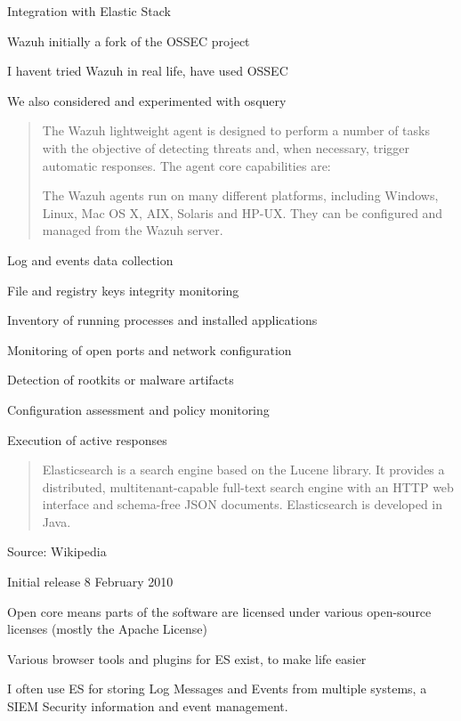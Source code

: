 \documentclass[Screen16to9,17pt]{foils}
\begin{document}
\begin{list2}
\item Integration with Elastic Stack
\item Wazuh initially a fork of the OSSEC project
\item I havent tried Wazuh in real life, have used OSSEC
\item We also considered and experimented with osquery 
\end{list2}



\begin{quote}
The Wazuh lightweight agent is designed to perform a number of tasks with the objective of detecting threats and, when necessary, trigger automatic responses. The agent core capabilities are:

The Wazuh agents run on many different platforms, including Windows, Linux, Mac OS X, AIX, Solaris and HP-UX. They can be configured and managed from the Wazuh server.
\end{quote}

\begin{list2}
\item Log and events data collection
\item File and registry keys integrity monitoring
\item Inventory of running processes and installed applications
\item Monitoring of open ports and network configuration
\item Detection of rootkits or malware artifacts
\item Configuration assessment and policy monitoring
\item Execution of active responses
\end{list2}



\begin{quote}
Elasticsearch is a search engine based on the Lucene library. It provides a distributed, multitenant-capable full-text search engine with an HTTP web interface and schema-free JSON documents. Elasticsearch is developed in Java.
\end{quote}

Source: Wikipedia 

\begin{list2}
\item Initial release	8 February 2010
\item Open core means parts of the software are licensed under various open-source licenses (mostly the Apache License)
\item Various browser tools and plugins for ES exist, to make life easier
\item I often use ES for storing Log Messages and Events from multiple systems, a SIEM Security information and event management.
\end{list2}
\end{document}
